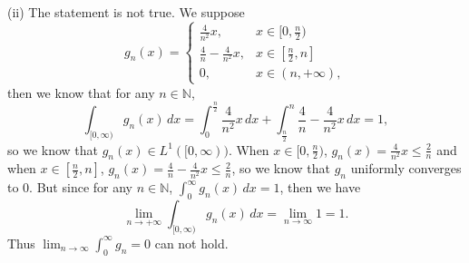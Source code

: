 \documentclass[12pt,a4paper]{ctexart}
\begin{document}
(ii) The statement is not true. We suppose 
\begin{equation*}
g_{n}(x) =
\left\{
             \begin{array}{cl}
             \frac{4}{n^{2}} x, & x \in [0, \frac{n}{2}) \\
             \frac{4}{n} - \frac{4}{n^{2}} x, & x \in [\frac{n}{2}, n]  \\
             0, & x \in (n, + \infty),
             \end{array}
\right.
\end{equation*}
then we know that for any $n \in \mathbb{N}$,
\begin{equation*}
    \int_{[0, \infty)}^{} g_{n} (x) \, d x = \int_{0}^{\frac{n}{2}} \frac{4}{n^{2}} x \, d x + \int_{\frac{n}{2}}^{n} \frac{4}{n} - \frac{4}{n^{2}} x \, d x = 1,
\end{equation*}
so we know that $g_{n} (x) \in L^{1}([0, \infty))$. When $x \in [0, \frac{n}{2})$, $g_{n}(x) = \frac{4}{n^{2}} x \leq \frac{2}{n}$ and when $x \in [\frac{n}{2}, n]$, $g_{n} (x) = \frac{4}{n} - \frac{4}{n^{2}} x \leq \frac{2}{n}$, so we know that $g_{n}$ uniformly converges to $0$. But since for any $n \in \mathbb{N}$, $\int_{0}^{\infty} g_{n}(x) \, d x  = 1$, then we have
\begin{equation*}
    \lim_{n \to + \infty} \int_{[0, \infty)}^{} g_{n} (x) \, d x = \lim_{n \to \infty} 1 = 1.
\end{equation*}
Thus $\lim_{n \to \infty} \int_{0}^{\infty} g_{n} = 0$ can not hold.
\end{document}

